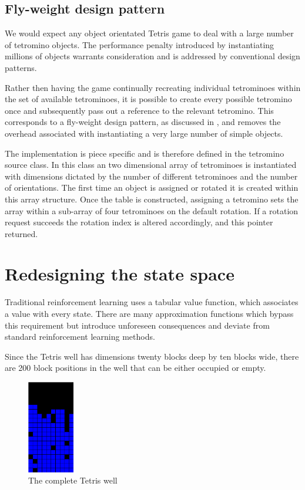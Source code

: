 \documentclass{rucsthesis}
\begin{document}
\subsection{Fly-weight design pattern}

We would expect any object orientated Tetris game to deal with a large number of tetromino objects. The performance penalty introduced by instantiating millions of objects warrants consideration and is addressed by conventional design patterns. 

Rather then having the game continually recreating individual tetrominoes within the set of available tetrominoes, it is possible to create every possible tetromino once and subsequently pass out a reference to the relevant tetromino. This corresponds to a fly-weight design pattern, as discussed in \cite{designp}, and removes the overhead associated with instantiating a very large number of simple objects.

The implementation is piece specific and is therefore defined in the tetromino source class. In this class an two dimensional array of tetrominoes is instantiated with dimensions dictated by the number of different tetrominoes and the number of orientations. The first time an object is assigned or rotated it is created within this array structure. Once the table is constructed, assigning a tetromino sets the array within a sub-array of four tetrominoes on the default rotation. If a rotation request succeeds the rotation index is altered accordingly, and this pointer returned.

\section{Redesigning the state space}

Traditional reinforcement learning uses a tabular value function, which associates a value with every state. There are many approximation functions which bypass this requirement but introduce unforeseen consequences and deviate from standard reinforcement learning methods.

Since the Tetris well has dimensions twenty blocks deep by ten blocks wide, there are 200 block positions in the well that can be either occupied or empty.

\begin{figure}[h]
\centering
\includegraphics[width=0.8in]{fullwell.png}
\caption{The complete Tetris well}
\label{fig:fullwell}
\end{figure}
\end{document}

